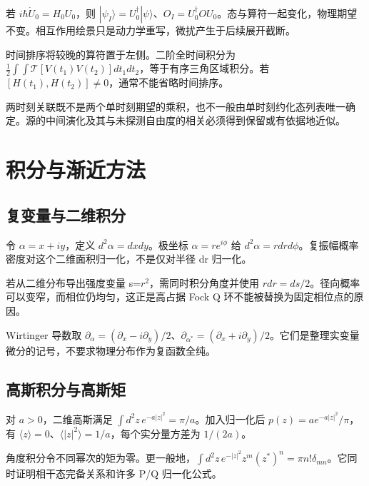 \documentclass[UTF8,a4paper,zihao=-4,openany,fontset=fandol]{ctexbook}
\begin{document}
若 $i\hbar\dot U_0=H_0U_0$，则 $|\psi_I\rangle=U_0^\dagger|\psi\rangle$、$O_I=U_0^\dagger OU_0$。态与算符一起变化，物理期望不变。相互作用绘景只是动力学重写，微扰产生于后续展开截断。



时间排序将较晚的算符置于左侧。二阶全时间积分为 $\tfrac12\int\int\mathcal T[V(t_1)V(t_2)]dt_1dt_2$，等于有序三角区域积分。若 $[H(t_1),H(t_2)]\ne0$，通常不能省略时间排序。



两时刻关联既不是两个单时刻期望的乘积，也不一般由单时刻约化态列表唯一确定。源的中间演化及其与未探测自由度的相关必须得到保留或有依据地近似。



\chapter{积分与渐近方法}\label{ch:B}


\section{复变量与二维积分}\label{sec:B:1}


令 $\alpha=x+iy$，定义 $d^2\alpha=dxdy$。极坐标 $\alpha=re^{i\phi}$ 给 $d^2\alpha=rdrd\phi$。复振幅概率密度对这个二维面积归一化，不是仅对半径 dr 归一化。



若从二维分布导出强度变量 s=$r^2$，需同时积分角度并使用 $rdr=ds/2$。径向概率可以变窄，而相位仍均匀，这正是高占据 Fock Q 环不能被替换为固定相位点的原因。



Wirtinger 导数取 $\partial_\alpha=(\partial_x-i\partial_y)/2$、$\partial_{\alpha^*}=(\partial_x+i\partial_y)/2$。它们是整理实变量微分的记号，不要求物理分布作为复函数全纯。



\section{高斯积分与高斯矩}\label{sec:B:2}


对 $a>0$，二维高斯满足 $\int d^2z\,e^{-a|z|^2}=\pi/a$。加入归一化后 $p(z)=a e^{-a|z|^2}/\pi$，有 $\langle z\rangle=0$、$\langle|z|^2\rangle=1/a$，每个实分量方差为 $1/(2a)$。



角度积分令不同幂次的矩为零。更一般地，$\int d^2z\,e^{-|z|^2}z^m(z^*)^n=\pi n!\delta_{mn}$。它同时证明相干态完备关系和许多 P/Q 归一化公式。
\end{document}
